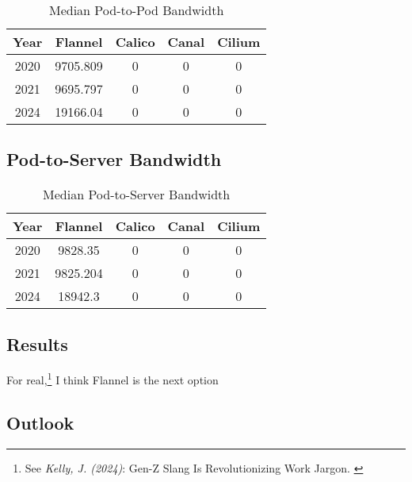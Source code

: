 \begin{table}[h!]
\caption{Median Pod-to-Pod Bandwidth}
\begin{tabular}{|c | c | c | c | c|} 
 \hline
 Year & Flannel & Calico & Canal & Cilium \\
 \hline\hline
 2020 & 9705.809 & 0 & 0 & 0 \\ 
 \hline
 2021 & 9695.797 & 0 & 0 & 0 \\
 \hline
 2024 & 19166.04 & 0 & 0 & 0 \\
 \hline
\end{tabular}
\label{tab:p2pbw}
\end{table}

\subsection{Pod-to-Server Bandwidth}

\begin{table}[h!]
\caption{Median Pod-to-Server Bandwidth}
\begin{tabular}{|c | c | c | c | c|} 
 \hline
 Year & Flannel & Calico & Canal & Cilium \\
 \hline\hline
 2020 & 9828.35 & 0 & 0 & 0 \\ 
 \hline
 2021 & 9825.204 & 0 & 0 & 0 \\
 \hline
 2024 & 18942.3 & 0 & 0 & 0 \\
 \hline
\end{tabular}
\label{tab:p2ebw}
\end{table}

\subsection{Results}

For real,\footnote{See \textit{Kelly, J. (2024)}: Gen-Z Slang Is Revolutionizing Work Jargon. \cite{genzSlang}} I think Flannel is the next option

\subsection{Outlook}
